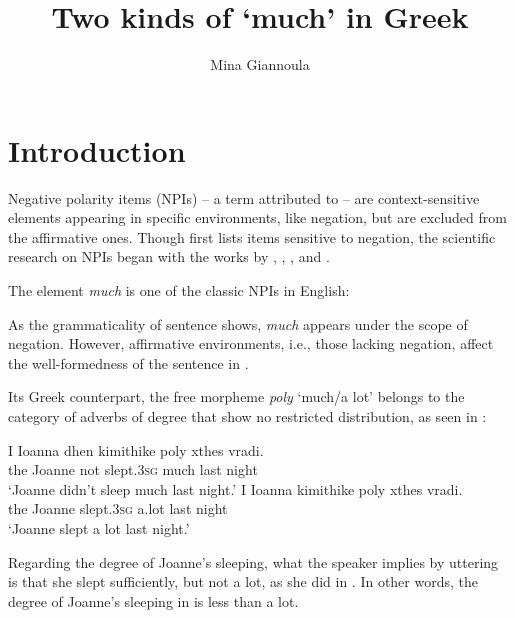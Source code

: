 \documentclass[output=paper]{langscibook}
\author{Mina Giannoula\affiliation{University of Chicago}}
\title{Two kinds of `much' in Greek}
\begin{document}
\maketitle

\section{Introduction} 

Negative polarity items (NPIs) -- a term attributed to \citet{baker1970} -- are context-sensitive elements appearing in specific environments, like negation, but are excluded from the affirmative ones. Though \citet{buyssens1959} first lists items sensitive to negation, the scientific research on NPIs began with the works by \citet{klima1964}, \citet{horn1972prop}, \citet{fauconnier1975a, fauconnier1975b}, and \citet{ladusaw1979}.

The element \textit{much} is one of the classic NPIs in English:\largerpage[-1]

\ea\label{gia:ex1}
        \label{gia:ex1a}
        \label{gia:ex1b}
\z\z

\noindent As the grammaticality of sentence  shows, \textit{much} appears under the scope of negation. However, affirmative environments, i.e., those lacking negation, affect the well-formedness of the sentence in .

Its Greek counterpart, the free morpheme \textit{poly} ‘much/a lot’ belongs to the category of adverbs of degree that show no restricted distribution, as seen in :

\begin{exe}
\ex\label{gia:ex2} \begin{xlist}
        \ex\label{gia:ex2a} \gll I Ioanna dhen kimithike poly xthes vradi. \\
        the Joanne not slept.\textsc{3sg} much last night \\
        \trans `Joanne didn't sleep much last night.'
        \ex\label{gia:ex2b} \gll I Ioanna kimithike poly xthes vradi. \\
        the Joanne slept.\textsc{3sg} a.lot last night \\
        \trans `Joanne slept a lot last night.'
    \end{xlist}
\end{exe}

\noindent Regarding the degree of Joanne’s sleeping, what the speaker implies by uttering  is that she slept  sufficiently, but not a lot, as she did in . In other words, the degree of Joanne’s sleeping in  is less than a lot.
\end{document}
